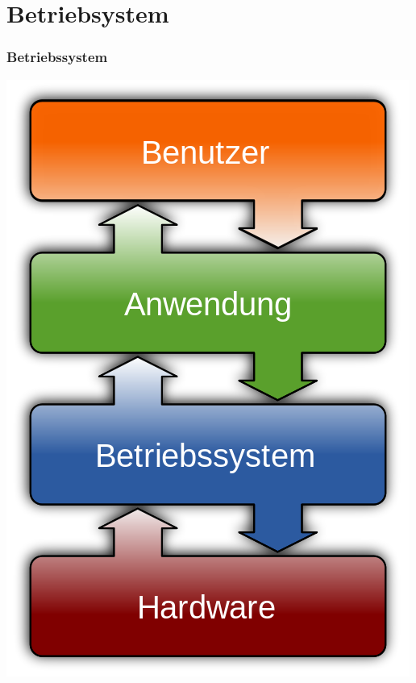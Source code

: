 \documentclass[compress]{beamer}
\begin{document}
\section{Betriebsystem}
\begin{frame}
	\frametitle{Betriebssystem}
	\begin{center}
	\includegraphics[scale=0.25]{media/500px-Operating_system_placement-de.png}
	\end{center}
\end{frame}
\end{document}
